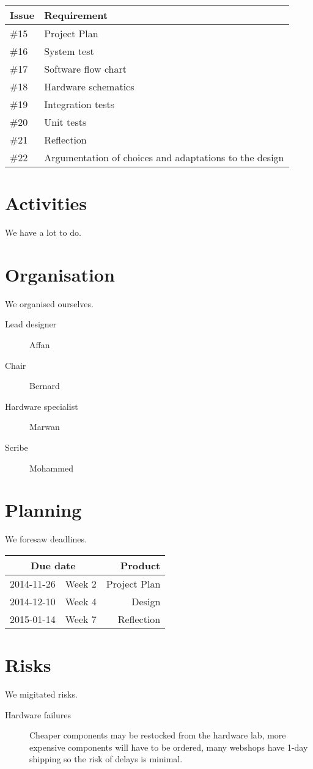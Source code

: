 \documentclass[twoside,a4paper,11pt,titlepage]{report}
\begin{document}
\begin{tabular}[hbp]{ll}
\hline Issue & Requirement \\\hline
\hline
\#15 & Project Plan \\
\#16 & System test \\
\#17 & Software flow chart \\
\#18 & Hardware schematics \\
\#19 & Integration tests \\
\#20 & Unit tests \\
\#21 & Reflection \\
\#22 & Argumentation of choices and adaptations to the design \\
\hline
\end{tabular}

\chapter{Activities}
We have a lot to do.
\chapter{Organisation}
We organised ourselves.

\begin{description}
	\item[Lead designer] Affan
	\item[Chair] Bernard
	\item[Hardware specialist] Marwan
	\item[Scribe] Mohammed
\end{description}
\chapter{Planning}
We foresaw deadlines.

\begin{tabular}[hbp]{llr}
\hline
\multicolumn{2}{c}{Due date} & Product \\
\hline
2014-11-26 & Week 2 & Project Plan \\
2014-12-10 & Week 4 & Design \\
2015-01-14 & Week 7 & Reflection \\
\hline
\end{tabular}
\chapter{Risks}
We migitated risks.

\begin{description}
	\item [Hardware failures] Cheaper components may be restocked from the hardware lab, more expensive components will have to be ordered, many webshops have 1-day shipping so the risk of delays is minimal.
\end{description}
\end{document}

